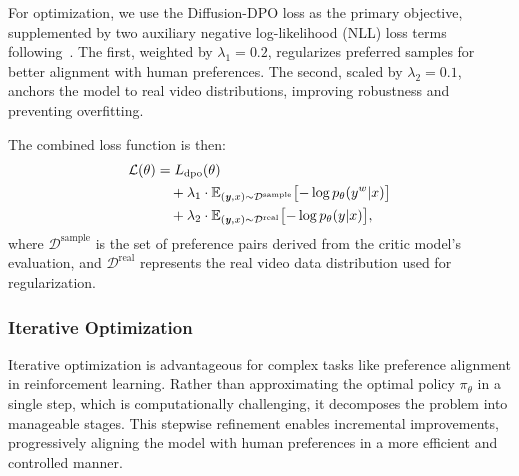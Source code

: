 For optimization, we use the Diffusion-DPO loss as the primary objective, supplemented by two auxiliary negative log-likelihood (NLL) loss terms following~\cite{pang2024iterativereasoningpreferenceoptimization}. The first, weighted by $\lambda_1 = 0.2$, regularizes preferred samples for better alignment with human preferences. The second, scaled by $\lambda_2 = 0.1$, anchors the model to real video distributions, improving robustness and preventing overfitting.


The combined loss function is then:
\small
\begin{equation}
\begin{aligned}
\mathcal{L}(\theta) &= L_{\text{dpo}}(\theta) \\
&\quad + \lambda_1 \cdot \mathbb{E}_{(\textbf{\textit{y}}, x) \sim \mathcal{D}^{\mathrm{sample}}} \bigl[-\log p_{\theta}(y^w|x)\bigr] \\
&\quad + \lambda_2 \cdot \mathbb{E}_{(\textbf{\textit{y}}, x) \sim \mathcal{D}^{\mathrm{real}}} \bigl[-\log p_{\theta}(y|x)\bigr],
\end{aligned}
\end{equation}
\normalsize
where $\mathcal{D}^{\mathrm{sample}}$ is the set of preference pairs derived from the critic model's evaluation, and $\mathcal{D}^{\mathrm{real}}$ represents the real video data distribution used for regularization.

\subsubsection{Iterative Optimization}

Iterative optimization is advantageous for complex tasks like preference alignment in reinforcement learning. Rather than approximating the optimal policy $\pi_\theta$ in a single step, which is computationally challenging, it decomposes the problem into manageable stages. This stepwise refinement enables incremental improvements, progressively aligning the model with human preferences in a more efficient and controlled manner.


